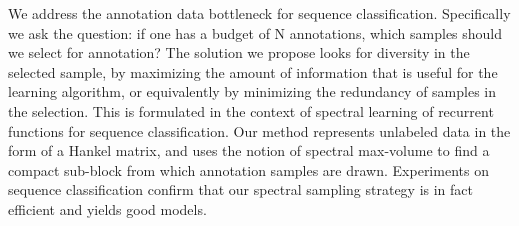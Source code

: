 We address the annotation data bottleneck for sequence classification. Specifically we ask the question: if one has a budget of N annotations, which samples should we select for annotation? The solution we propose looks for diversity in the selected sample, by maximizing the amount of information that is useful for the learning algorithm, or equivalently by minimizing the redundancy of samples in the selection. This is formulated in the context of spectral learning of recurrent functions for sequence classification. Our method represents unlabeled data in the form of a Hankel matrix, and uses the notion of spectral max-volume to find a compact sub-block from which annotation samples are drawn. Experiments on sequence classification confirm that our spectral sampling strategy is in fact efficient and yields good models.
